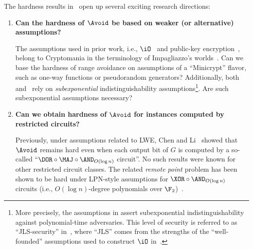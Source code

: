The hardness results in~\cite{DBLP:conf/stoc/IlangoLW23, DBLP:conf/stoc/ChenL24} open up several exciting research directions:
\begin{enumerate}
    \item {\bf Can the hardness of $\Avoid$ be based on weaker (or alternative) assumptions?}
    
    The assumptions used in prior work, i.e., $\iO$~\cite{DBLP:conf/stoc/IlangoLW23} and public-key encryption~\cite{DBLP:conf/stoc/ChenL24}, belong to Cryptomania in the terminology of Impagliazzo's worlds~\cite{Impagliazzo95}. Can we base the hardness of range avoidance on assumptions of a ``Minicrypt'' flavor, such as one-way functions or pseudorandom generators? Additionally, both~\cite{DBLP:conf/stoc/IlangoLW23} and~\cite{DBLP:conf/stoc/ChenL24} rely on \emph{subexponential} indistinguishability assumptions\footnote{More precisely, the assumptions in \cite{DBLP:conf/stoc/IlangoLW23, DBLP:conf/stoc/ChenL24} assert subexponential indistinguishability against polynomial-time adversaries. This level of security is referred to as ``JLS-security'' in~\cite{DBLP:conf/stoc/IlangoLW23}, where ``JLS'' comes from the strengths of the ``well-founded'' assumptions used to construct $\iO$ in~\cite{JainLS21}.}. Are such subexponential assumptions necessary?
    \item {\bf Can we obtain hardness of $\Avoid$ for instances computed by restricted circuits?}
    
    Previously, under assumptions related to LWE, Chen and Li~\cite{DBLP:conf/stoc/ChenL24} showed that $\Avoid$ remains hard even when each output bit of $G$ is computed by a so-called ``$\DOR\circ\MAJ\circ\AND_{O(\log n)}$ circuit''. No such results were known for other restricted circuit classes. The related \emph{remote point} problem has been shown to be hard under LPN-style assumptions for $\XOR\circ\AND_{O(\log n)}$ circuits (i.e., $O(\log n)$-degree polynomials over $\F_2$)~\cite{DBLP:conf/stoc/ChenL24}.
\end{enumerate}

